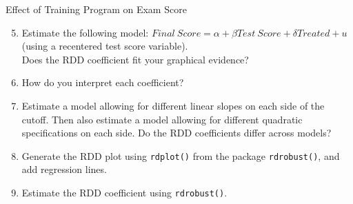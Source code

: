 \documentclass[11pt, aspectratio = 169]{beamer}
\begin{document}
			
			\begin{frame}{Effect of Training Program on Exam Score}
				
				\begin{enumerate}\setcounter{enumi}{4}
					\item Estimate the following model: $Final \: Score = \alpha + \beta Test \: Score + \delta Treated + u$ (using a recentered test score variable). \\
					Does the RDD coefficient fit your graphical evidence? %
					\item  How do you interpret each coefficient?
					\item  Estimate a model  allowing for different linear slopes on each side of the cutoff. Then also estimate a model allowing for different quadratic specifications on each side. Do the RDD coefficients differ across models?
					
					\item Generate the RDD plot using \texttt{rdplot()} from the package \texttt{rdrobust()}, and add regression lines.
					
					\item Estimate the RDD coefficient using \texttt{rdrobust()}. 
				\end{enumerate}
			\end{frame}
\end{document}
